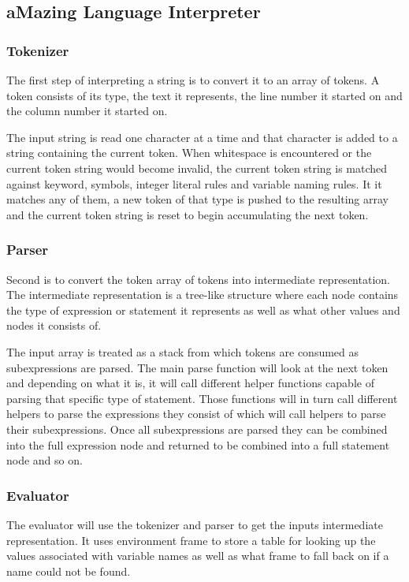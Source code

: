 \subsection{aMazing Language Interpreter}

\subsubsection{Tokenizer}

The first step of interpreting a string is to convert it to an array of tokens. A token consists of its type, the text it represents, the line number it started on and the column number it started on.

The input string is read one character at a time and that character is added to a string containing the current token. When whitespace is encountered or the current token string would become invalid, the current token string is matched against keyword, symbols, integer literal rules and variable naming rules. It it matches any of them, a new token of that type is pushed to the resulting array and the current token string is reset to begin accumulating the next token.

\subsubsection{Parser}

Second is to convert the token array of tokens into intermediate representation. The intermediate representation is a tree-like structure where each node contains the type of expression or statement it represents as well as what other values and nodes it consists of.

The input array is treated as a stack from which tokens are consumed as subexpressions are parsed. The main parse function will look at the next token and depending on what it is, it will call different helper functions capable of parsing that specific type of statement. Those functions will in turn call different helpers to parse the expressions they consist of which will call helpers to parse their subexpressions. Once all subexpressions are parsed they can be combined into the full expression node and returned to be combined into a full statement node and so on.

\subsubsection{Evaluator}

The evaluator will use the tokenizer and parser to get the inputs intermediate representation. It uses environment frame to store a table for looking up the values associated with variable names as well as what frame to fall back on if a name could not be found.

